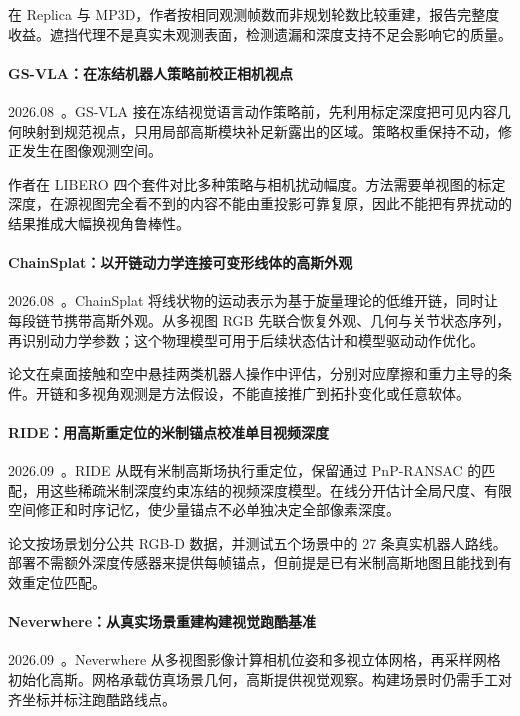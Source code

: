 在 Replica 与 MP3D，作者按相同观测帧数而非规划轮数比较重建，报告完整度收益。遮挡代理不是真实未观测表面，检测遗漏和深度支持不足会影响它的质量。

\paragraph{GS-VLA：在冻结机器人策略前校正相机视点}
2026.08~\cite{2608_19066}。GS-VLA 接在冻结视觉语言动作策略前，先利用标定深度把可见内容几何映射到规范视点，只用局部高斯模块补足新露出的区域。策略权重保持不动，修正发生在图像观测空间。

作者在 LIBERO 四个套件对比多种策略与相机扰动幅度。方法需要单视图的标定深度，在源视图完全看不到的内容不能由重投影可靠复原，因此不能把有界扰动的结果推成大幅换视角鲁棒性。

\paragraph{ChainSplat：以开链动力学连接可变形线体的高斯外观}
2026.08~\cite{2608_28570}。ChainSplat 将线状物的运动表示为基于旋量理论的低维开链，同时让每段链节携带高斯外观。从多视图 RGB 先联合恢复外观、几何与关节状态序列，再识别动力学参数；这个物理模型可用于后续状态估计和模型驱动动作优化。

论文在桌面接触和空中悬挂两类机器人操作中评估，分别对应摩擦和重力主导的条件。开链和多视角观测是方法假设，不能直接推广到拓扑变化或任意软体。

\paragraph{RIDE：用高斯重定位的米制锚点校准单目视频深度}
2026.09~\cite{2609_11079}。RIDE 从既有米制高斯场执行重定位，保留通过 PnP-RANSAC 的匹配，用这些稀疏米制深度约束冻结的视频深度模型。在线分开估计全局尺度、有限空间修正和时序记忆，使少量锚点不必单独决定全部像素深度。

论文按场景划分公共 RGB-D 数据，并测试五个场景中的 27 条真实机器人路线。部署不需额外深度传感器来提供每帧锚点，但前提是已有米制高斯地图且能找到有效重定位匹配。

\paragraph{Neverwhere：从真实场景重建构建视觉跑酷基准}
2026.09~\cite{2609_16443}。Neverwhere 从多视图影像计算相机位姿和多视立体网格，再采样网格初始化高斯。网格承载仿真场景几何，高斯提供视觉观察。构建场景时仍需手工对齐坐标并标注跑酷路线点。

